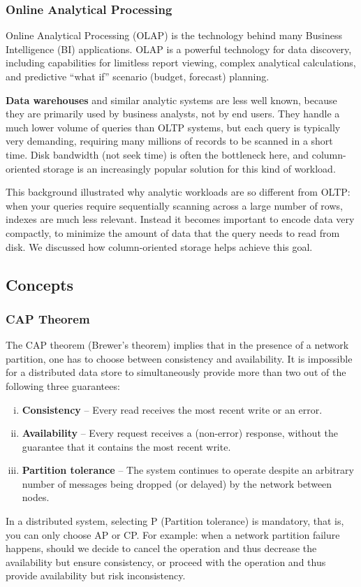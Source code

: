 \documentclass{article}
\begin{document}
    \subsubsection{Online Analytical Processing}
    Online Analytical Processing (OLAP) is the technology behind many Business Intelligence (BI) applications. OLAP is a powerful technology for data discovery, including capabilities for limitless report viewing, complex analytical calculations, and predictive “what if” scenario (budget, forecast) planning.

    \textbf{Data warehouses} and similar analytic systems are less well known, because they are primarily used by business analysts, not by end users. They handle a much lower volume of queries than OLTP systems, but each query is typically very demanding, requiring many millions of records to be scanned in a short time. Disk bandwidth (not seek time) is often the bottleneck here, and column-oriented storage is an increasingly popular solution for this kind of workload.
    
    This background illustrated why analytic workloads are so different from OLTP: when your queries require sequentially scanning across a large number of rows, indexes are much less relevant. Instead it becomes important to encode data very compactly, to minimize the amount of data that the query needs to read from disk. We discussed how column-oriented storage helps achieve this goal.
    
    \subsection{Concepts}
    \subsubsection{CAP Theorem}
    The CAP theorem (Brewer's theorem) implies that in the presence of a network partition, one has to choose between consistency and availability. It is impossible for a distributed data store to simultaneously provide more than two out of the following three guarantees:
    \begin{enumerate}[i.]
        \item \textbf{Consistency} -- Every read receives the most recent write or an error.
        \item \textbf{Availability} -- Every request receives a (non-error) response, without the guarantee that it contains the most recent write.
        \item \textbf{Partition tolerance} -- The system continues to operate despite an arbitrary number of messages being dropped (or delayed) by the network between nodes.
    \end{enumerate}
    In a distributed system, selecting P (Partition tolerance) is mandatory, that is, you can only choose AP or CP. For example: when a network partition failure happens, should we decide to cancel the operation and thus decrease the availability but ensure consistency, or proceed with the operation and thus provide availability but risk inconsistency.
    
\end{document}
